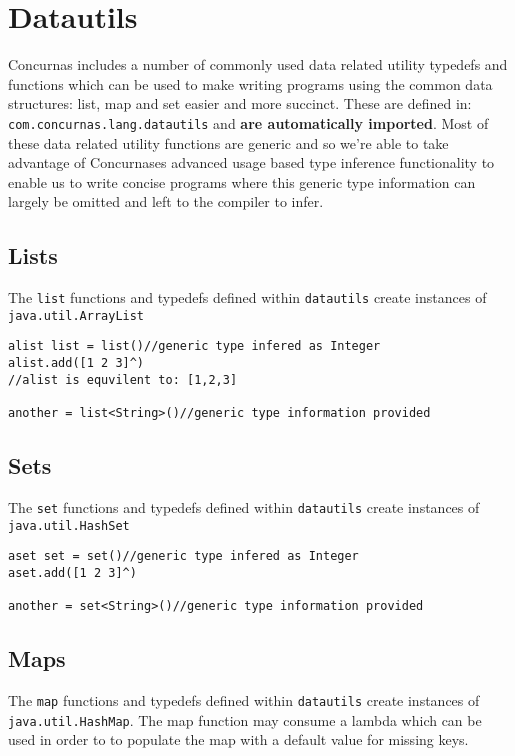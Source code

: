 \documentclass[conc-doc]{subfiles}
\begin{document}
	\chapter[Datautils]{Datautils}

Concurnas includes a number of commonly used data related utility typedefs and functions which can be used to make writing programs using the common data structures: list, map and set easier and more succinct. These are defined in: \lstinline{com.concurnas.lang.datautils} and \textbf{are automatically imported}. Most of these data related utility functions are generic and so we're able to take advantage of Concurnases advanced usage based type inference functionality to enable us to write concise programs where this generic type information can largely be omitted and left to the compiler to infer.

\section{Lists}
The \lstinline{list} functions and typedefs defined within \lstinline{datautils} create instances of \lstinline{java.util.ArrayList}

\begin{lstlisting}
alist list = list()//generic type infered as Integer
alist.add([1 2 3]^)
//alist is equvilent to: [1,2,3]

another = list<String>()//generic type information provided
\end{lstlisting}

\section{Sets}
The \lstinline{set} functions and typedefs defined within \lstinline{datautils} create instances of \lstinline{java.util.HashSet}

\begin{lstlisting}
aset set = set()//generic type infered as Integer
aset.add([1 2 3]^)

another = set<String>()//generic type information provided
\end{lstlisting}

\section{Maps}
The \lstinline{map} functions and typedefs defined within \lstinline{datautils} create instances of \lstinline{java.util.HashMap}. The map function may consume a lambda which can be used in order to to populate the map with a default value for missing keys.
\end{document}
